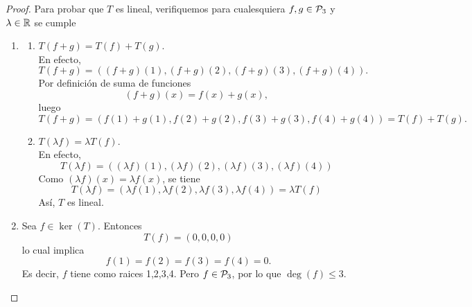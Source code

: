\documentclass[12pt,a4paper]{article}
\begin{document}
        \begin{proof}
        Para probar que $T$ es lineal, verifiquemos para cualesquiera $f,g\in\mathcal{P}_{3}$ y $\lambda\in\mathbb{R}$
        se cumple
        \begin{enumerate}
            \item[(a)]
            \begin{enumerate}
                \item[1.] $T(f+g)=T(f)+T(g)$.\\
                En efecto,
                \begin{equation*}
                    T(f+g)=((f+g)(1),(f+g)(2),(f+g)(3),(f+g)(4)).
                \end{equation*}
                Por definición de suma de funciones
                \begin{equation*}
                    (f+g)(x)=f(x)+g(x),
                \end{equation*}
                luego
                \begin{equation*}
                    T(f+g)=(f(1)+g(1),f(2)+g(2),f(3)+g(3),f(4)+g(4))=T(f)+T(g).
                \end{equation*}
                \item[2.] $T(\lambda f)=\lambda T(f)$.\\
                En efecto,
                \begin{equation*}
                    T(\lambda f)=((\lambda f)(1),(\lambda f)(2),(\lambda f)(3), (\lambda f)(4))
                \end{equation*}
                Como $(\lambda f)(x)=\lambda f(x)$, se tiene
                \begin{equation*}
                    T(\lambda f)=(\lambda f(1), \lambda f(2), \lambda f(3), \lambda f(4))=\lambda T(f)
                \end{equation*}
                Así, $T$ es lineal.
            \end{enumerate}
            \item[(b)] Sea $f\in\ker(T)$. Entonces
            \begin{equation*}
                T(f)=(0,0,0,0)
            \end{equation*}
            lo cual implica
            \begin{equation*}
                f(1)=f(2)=f(3)=f(4)=0.
            \end{equation*}
            Es decir, $f$ tiene como raices 1,2,3,4. Pero $f\in\mathcal{P}_{3}$, por lo que $\deg(f)\leq3$.

\end{enumerate}
\end{proof}
\end{document}

